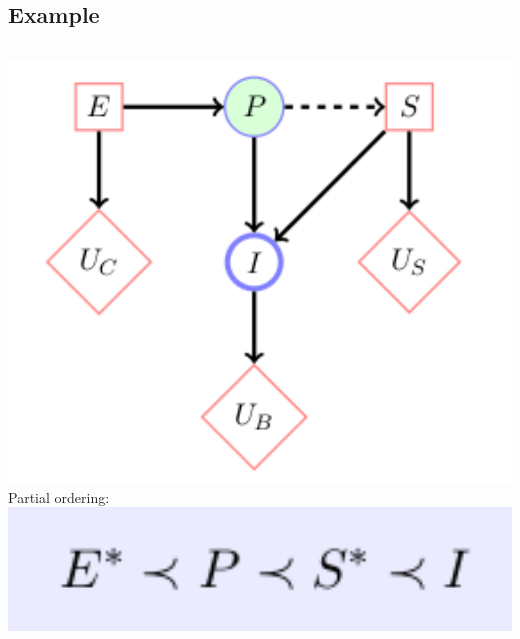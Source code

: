 \subsection{Example}
\begin{frame}
\begin{columns}
\includegraphics[width=1\textwidth]{figures/bdn}
Partial ordering:
\includegraphics[width=1\textwidth]{figures/partorder}
\end{columns}
\end{frame}


